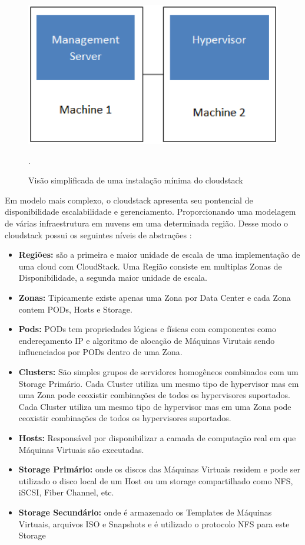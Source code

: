 \begin{figure}[!htb]
\centering
\includegraphics [keepaspectratio=true,scale=0.60]{figuras/cloudstack_minimal.eps}
\caption{Visão simplificada de uma instalação mínima do cloudstack}
\cite{cloudstack}.
\label{cloudstatck_minimal}
\end{figure}

Em modelo mais complexo, o cloudstack apresenta seu pontencial de disponibilidade escalabilidade e gerenciamento. Proporcionando uma modelagem de várias
infraestrutura em nuvens em uma determinada região. Desse modo o cloudstack possui os seguintes níveis de abstrações \cite{shape}:

\begin{itemize}
\item \textbf{Regiões:} são a primeira e maior unidade de escala de uma implementação de uma cloud com CloudStack. Uma Região consiste em multiplas Zonas de Disponibilidade, a segunda maior unidade de escala.
\item \textbf{Zonas: } Tipicamente existe apenas uma Zona por Data Center e cada Zona contem PODs, Hosts e Storage.
\item \textbf{Pods: } PODs tem propriedades lógicas e físicas com componentes como endereçamento IP e algoritmo de alocação de Máquinas Virutais sendo influenciados por PODs dentro de uma Zona.
\item \textbf{Clusters: } São simples grupos de servidores homogêneos combinados com um Storage Primário. Cada Cluster utiliza um mesmo tipo de hypervisor mas em uma Zona pode ceoxistir combinações de todos os hypervisores suportados. Cada Cluster utiliza um mesmo tipo de hypervisor mas em uma Zona pode ceoxistir combinações de todos os hypervisores suportados.
\item \textbf{Hosts: } Responsável por disponibilizar a camada de computação real em que Máquinas Virtuais são executadas.
\item \textbf{Storage Primário: }  onde os discos das Máquinas Virtuais residem e pode ser utilizado o disco local de um Host ou um storage compartilhado como NFS, iSCSI, Fiber Channel, etc.
\item \textbf{Storage Secundário:} onde é armazenado os Templates de Máquinas Virtuais, arquivos ISO e Snapshots e é utilizado o protocolo NFS para este Storage
\end{itemize}


